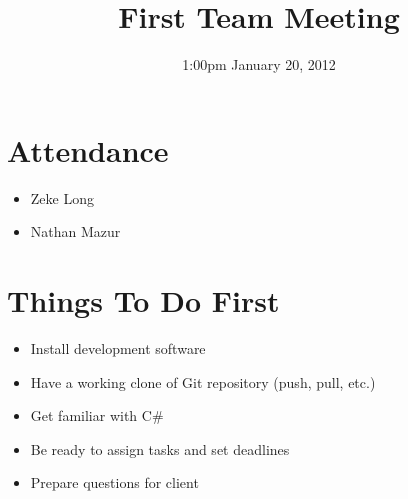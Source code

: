 \documentclass{article}
\begin{document}
\title{First Team Meeting}
\date{1:00pm January 20, 2012}
\maketitle

\section{Attendance}
\begin{itemize}
\item Zeke Long
\item Nathan Mazur
\end{itemize}

\section{Things To Do First}
\begin{itemize}
\item Install development software
\item Have a working clone of Git repository (push, pull, etc.)
\item Get familiar with C\#
\item Be ready to assign tasks and set deadlines
\item Prepare questions for client
\end{itemize}
\end{document}
